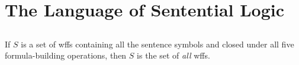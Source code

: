 \documentclass{report}
\begin{document}
\section{The Language of Sentential Logic}%

\subsection{}%

  \begin{theorem}
    If $S$ is a set of wffs containing all the sentence symbols and closed under
      all five formula-building operations, then $S$ is the set of \textit{all}
      wffs.
  \end{theorem}
\end{document}
